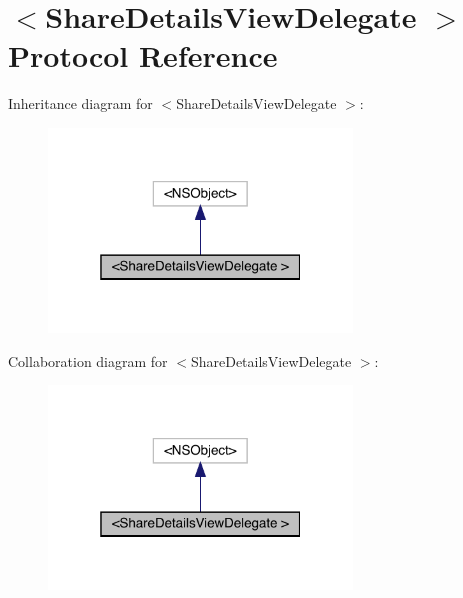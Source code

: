 \hypertarget{protocol_share_details_view_delegate_01-p}{}\section{$<$Share\+Details\+View\+Delegate $>$ Protocol Reference}
\label{protocol_share_details_view_delegate_01-p}


Inheritance diagram for $<$Share\+Details\+View\+Delegate $>$\+:\nopagebreak
\begin{figure}[H]
\begin{center}
\leavevmode
\includegraphics[width=229pt]{protocol_share_details_view_delegate_01-p__inherit__graph}
\end{center}
\end{figure}


Collaboration diagram for $<$Share\+Details\+View\+Delegate $>$\+:\nopagebreak
\begin{figure}[H]
\begin{center}
\leavevmode
\includegraphics[width=229pt]{protocol_share_details_view_delegate_01-p__coll__graph}
\end{center}
\end{figure}
